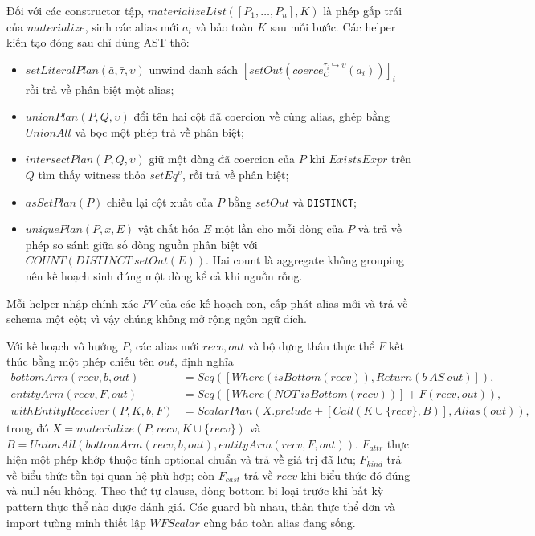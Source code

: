 \documentclass[11pt,a4paper]{article}
\theoremstyle{definition}
\begin{document}
Đối với các constructor tập, $materializeList([P_1,\ldots,P_n],K)$ là phép gấp
trái của $materialize$, sinh các alias mới $a_i$ và bảo toàn $K$ sau mỗi bước.
Các helper kiến tạo đóng sau chỉ dùng AST thô:
\begin{itemize}
  \item $setLiteralPlan(\bar a,\bar\tau,\upsilon)$ unwind danh sách
  $[setOut(coerce_C^{\tau_i\hookrightarrow\upsilon}(a_i))]_i$ rồi trả về
  phân biệt một alias;
  \item $unionPlan(P,Q,\upsilon)$ đổi tên hai cột đã coercion về cùng alias,
  ghép bằng $UnionAll$ và bọc một phép trả về phân biệt;
  \item $intersectPlan(P,Q,\upsilon)$ giữ một dòng đã coercion của $P$ khi
  $ExistsExpr$ trên $Q$ tìm thấy witness thỏa $setEq^\upsilon$, rồi trả về
  phân biệt;
  \item $asSetPlan(P)$ chiếu lại cột xuất của $P$ bằng $setOut$ và
  \texttt{DISTINCT};
  \item $uniquePlan(P,x,E)$ vật chất hóa $E$ một lần cho mỗi dòng của $P$ và
  trả về phép so sánh giữa số dòng nguồn phân biệt với
  $COUNT(DISTINCT\ setOut(E))$. Hai count là aggregate không grouping nên kế
  hoạch sinh đúng một dòng kể cả khi nguồn rỗng.
\end{itemize}
Mỗi helper nhập chính xác $FV$ của các kế hoạch con, cấp phát alias mới và trả
về schema một cột; vì vậy chúng không mở rộng ngôn ngữ đích.

Với kế hoạch vô hướng $P$, các alias mới $recv,out$ và bộ dựng thân thực thể
$F$ kết thúc bằng một phép chiếu tên $out$, định nghĩa
\[
\begin{split}
bottomArm(recv,b,out)&=Seq([Where(isBottom(recv)),Return(b\ AS\ out)]),\\
entityArm(recv,F,out)&=Seq([Where(NOT\ isBottom(recv))]+F(recv,out)),\\
withEntityReceiver(P,K,b,F)&=
ScalarPlan(X.prelude+[Call(K\cup\{recv\},B)],Alias(out)),
\end{split}
\]
trong đó $X=materialize(P,recv,K\cup\{recv\})$ và
$B=UnionAll(bottomArm(recv,b,out),entityArm(recv,F,out))$.
$F_{attr}$ thực hiện một phép khớp thuộc tính optional chuẩn và trả về giá trị
đã lưu; $F_{kind}$ trả về biểu thức tồn tại quan hệ phù hợp; còn $F_{cast}$ trả
về $recv$ khi biểu thức đó đúng và null nếu không. Theo thứ tự clause, dòng
bottom bị loại trước khi bất kỳ pattern thực thể nào được đánh giá. Các guard
bù nhau, thân thực thể đơn và import tường minh thiết lập $WFScalar$ cùng bảo
toàn alias đang sống.
\end{document}
